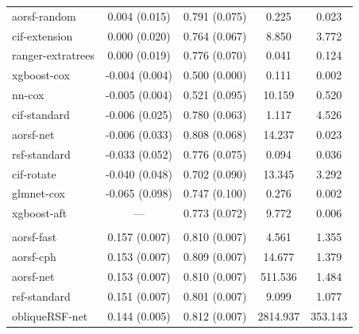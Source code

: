 \documentclass[twoside,11pt]{article}\usepackage[]{graphicx}\usepackage[]{xcolor}
\newenvironment{knitrout}{}{} %
\begin{document}
\begin{knitrout}
\begin{longtable}[t]{lcccc}
\hspace{1em}aorsf-random & 0.004 (0.015) & 0.791 (0.075) & 0.225 & 0.023\\
\hspace{1em}cif-extension & 0.000 (0.020) & 0.764 (0.067) & 8.850 & 3.772\\
\hspace{1em}ranger-extratrees & 0.000 (0.019) & 0.776 (0.070) & 0.041 & 0.124\\
\hspace{1em}xgboost-cox & -0.004 (0.004) & 0.500 (0.000) & 0.111 & 0.002\\
\hspace{1em}nn-cox & -0.005 (0.004) & 0.521 (0.095) & 10.159 & 0.520\\
\hspace{1em}cif-standard & -0.006 (0.025) & 0.780 (0.063) & 1.117 & 4.526\\
\hspace{1em}aorsf-net & -0.006 (0.033) & 0.808 (0.068) & 14.237 & 0.023\\
\hspace{1em}rsf-standard & -0.033 (0.052) & 0.776 (0.075) & 0.094 & 0.036\\
\hspace{1em}cif-rotate & -0.040 (0.048) & 0.702 (0.090) & 13.345 & 3.292\\
\hspace{1em}glmnet-cox & -0.065 (0.098) & 0.747 (0.100) & 0.276 & 0.002\\
\hspace{1em}xgboost-aft & --- & 0.773 (0.072) & 9.772 & 0.006\\
\addlinespace[0.3em]
\multicolumn{5}{l}{\textit{\textbf{ARIC; coronary heart disease, n = 13623, p = 41}}}\\
\hline
\hspace{1em}aorsf-fast & 0.157 (0.007) & 0.810 (0.007) & 4.561 & 1.355\\
\hspace{1em}aorsf-cph & 0.153 (0.007) & 0.809 (0.007) & 14.677 & 1.379\\
\hspace{1em}aorsf-net & 0.153 (0.007) & 0.810 (0.007) & 511.536 & 1.484\\
\hspace{1em}rsf-standard & 0.151 (0.007) & 0.801 (0.007) & 9.099 & 1.077\\
\hspace{1em}obliqueRSF-net & 0.144 (0.005) & 0.812 (0.007) & 2814.937 & 353.143\\

\end{longtable}
\end{knitrout}
\end{document}
